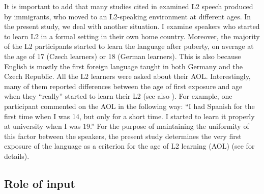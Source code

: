 It is important to add that many studies cited in \citet{PiskeEtAl2001} examined L2 speech produced by immigrants, who moved to an L2-speaking environment at different ages. In the present study, we deal with another situation. I examine speakers who started to learn L2 in a formal setting in their own home country. Moreover, the majority of the L2 participants started to learn the language after puberty, on average at the age of 17 (Czech learners) or 18 (German learners). This is also because English is mostly the first foreign language taught in both Germany and the Czech Republic. All the L2 learners were asked about their AOL. Interestingly, many of them reported differences between the age of first exposure and age when they “really” started to learn their L2 (see also \citealt{Piller2002}). For example, one participant commented on the AOL in the following way: “I had Spanish for the first time when I was 14, but only for a short time. I started to learn it properly at university when I was 19.” For the purpose of maintaining the uniformity of this factor between the speakers, the present study determines the very first exposure of the language as a criterion for the age of L2 learning (AOL) (see  for details).


\subsection{Role of input}\label{sec:2.1.4} %


